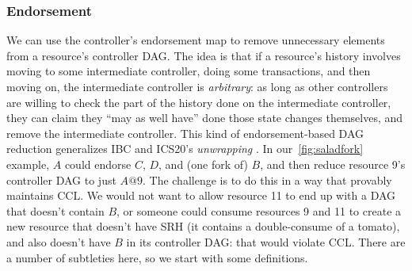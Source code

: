 \documentclass[a4paper,USenglish,cleveref, autoref, thm-restate, anonymous]{lipics-v2021}
\begin{document}
\begin{center}
\end{center}

\subsubsection{Endorsement}
We can use the controller's endorsement map to remove unnecessary elements from a resource's controller DAG.
The idea is that if a resource's history involves moving to some intermediate controller, doing some transactions, and then moving on, the intermediate controller is \textit{arbitrary}: as long as other controllers are willing to check the part of the history done on the intermediate controller, they can claim they ``may as well have'' done those state changes themselves, and remove the intermediate controller.
This kind of endorsement-based DAG reduction generalizes IBC and ICS20's \emph{unwrapping} \cite{wrapped,ibc,ics20}.
In our~\cref{fig:saladfork} example, $A$ could endorse $C$, $D$, and (one fork of) $B$, and then reduce resource 9's controller DAG to just $A@9$.
The challenge is to do this in a way that provably maintains CCL. 
We would not want to allow resource 11 to end up with a DAG that doesn't contain $B$, or someone could consume resources 9 and 11 to create a new resource that doesn't have SRH (it contains a double-consume of a tomato), and also doesn't have $B$ in its controller DAG: that would violate CCL.
There are a number of subtleties here, so we start with some definitions.
\end{document}
